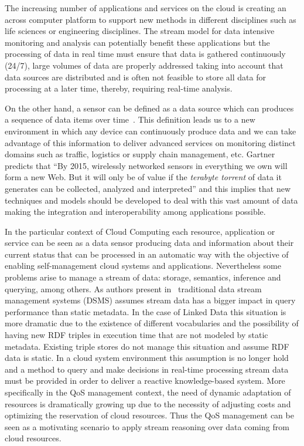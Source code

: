 The increasing number of applications and services on the cloud is creating an 
across computer platform to support new methods in different disciplines such as 
life sciences or engineering disciplines. The stream model for data intensive 
monitoring and analysis can potentially benefit these applications but the 
processing of data in real time must ensure that data is gathered continuously 
(24/7), large volumes of data are properly addressed taking into account that 
data sources are distributed and is often not feasible to store all data for 
processing at a later time, thereby, requiring real-time analysis. 

On the other hand, a sensor can be defined as a data source which can produces a 
sequence of data items over time~\cite{deri2010}. This definition leads us to a new 
environment in which any device can continuously produce data and we can take 
advantage of this information to deliver advanced services on monitoring 
distinct domains such as traffic, logistics or supply chain management, etc. 
Gartner predicts that ``By 2015, wirelessly networked sensors in everything we 
own will form a new Web. But it will only be of value if the \textit{terabyte torrent} 
of data it generates can be collected, analyzed and interpreted'' and this 
implies that new techniques and models should be developed to deal with this 
vast amount of data making the integration and interoperability among 
applications possible.

In the particular context of Cloud Computing each resource, application or 
service can be seen as a data sensor producing data and information about their 
current status that can be processed in an automatic way with the objective of 
enabling self-management cloud systems and applications. Nevertheless some 
problems arise to manage a stream of data: storage, semantics, inference and 
querying, among others. As authors present in~\cite{deri2010} traditional data stream 
management systems (DSMS) assumes stream data has a bigger impact in query 
performance than static metadata. In the case of Linked Data this situation is 
more dramatic due to the existence of different vocabularies and the possibility 
of having new RDF triples in execution time that are not modeled by static 
metadata. Existing triple stores do not manage this situation and assume RDF 
data is static. In a cloud system environment this assumption is no longer hold 
and a method to query and make decisions in real-time processing stream data 
must be provided in order to deliver a reactive knowledge-based system. More 
specifically in the QoS management context, the need of dynamic adaptation of 
resources is dramatically growing up due to the necessity of adjusting costs and 
optimizing the reservation of cloud resources. Thus the QoS management can be 
seen as a motivating scenario to apply stream reasoning over data coming from 
cloud resources.

